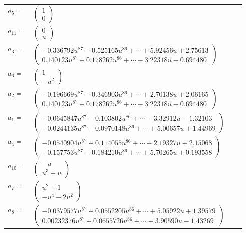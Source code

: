 \documentclass[1p]{elsarticle_modified}
\theoremstyle{definition}
\begin{document}
\begin{tabular}{m{7pt} m{180pt} m{7pt} m{180pt} }
\flushright $a_{5}=$&$\begin{pmatrix}1\\0\end{pmatrix}$ \\
\flushright $a_{11}=$&$\begin{pmatrix}0\\u\end{pmatrix}$ \\
\flushright $a_{3}=$&$\begin{pmatrix}-0.336792 u^{87}-0.525165 u^{86}+\cdots+5.92456 u+2.75613\\0.140123 u^{87}+0.178262 u^{86}+\cdots-3.22318 u-0.694480\end{pmatrix}$ \\
\flushright $a_{6}=$&$\begin{pmatrix}1\\- u^2\end{pmatrix}$ \\
\flushright $a_{2}=$&$\begin{pmatrix}-0.196669 u^{87}-0.346903 u^{86}+\cdots+2.70138 u+2.06165\\0.140123 u^{87}+0.178262 u^{86}+\cdots-3.22318 u-0.694480\end{pmatrix}$ \\
\flushright $a_{1}=$&$\begin{pmatrix}-0.0645847 u^{87}-0.103802 u^{86}+\cdots-3.32912 u-1.32103\\-0.0244135 u^{87}-0.0970148 u^{86}+\cdots+5.00657 u+1.44969\end{pmatrix}$ \\
\flushright $a_{4}=$&$\begin{pmatrix}-0.0540904 u^{87}-0.114055 u^{86}+\cdots-2.19327 u+2.15068\\-0.157753 u^{87}-0.184210 u^{86}+\cdots+5.70265 u+0.193558\end{pmatrix}$ \\
\flushright $a_{10}=$&$\begin{pmatrix}- u\\u^3+u\end{pmatrix}$ \\
\flushright $a_{7}=$&$\begin{pmatrix}u^2+1\\- u^4-2 u^2\end{pmatrix}$ \\
\flushright $a_{8}=$&$\begin{pmatrix}-0.0379577 u^{87}-0.0552205 u^{86}+\cdots+5.05922 u+1.39579\\0.00232376 u^{87}+0.0655726 u^{86}+\cdots-3.90590 u-1.43269\end{pmatrix}$ \\

\end{tabular}
\end{document}
